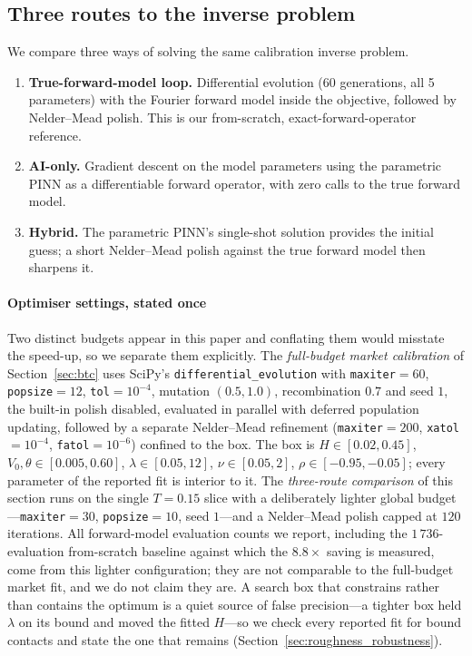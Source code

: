 \documentclass[preprint,12pt]{elsarticle}
\begin{document}
\subsection{Three routes to the inverse problem}
We compare three ways of solving the same calibration inverse problem.
\begin{enumerate}
  \item \textbf{True-forward-model loop.} Differential evolution (60
        generations, all 5 parameters) with the Fourier forward model inside the
        objective, followed by Nelder--Mead polish. This is our from-scratch,
        exact-forward-operator reference.
  \item \textbf{AI-only.} Gradient descent on the model parameters using the
        parametric PINN as a differentiable forward operator, with zero calls to
        the true forward model.
  \item \textbf{Hybrid.} The parametric PINN's single-shot solution provides the
        initial guess; a short Nelder--Mead polish against the true forward
        model then sharpens it.
\end{enumerate}

\paragraph{Optimiser settings, stated once}\label{par:optimiser}
Two distinct budgets appear in this paper and conflating them would misstate the
speed-up, so we separate them explicitly. The \emph{full-budget market
calibration} of Section~\ref{sec:btc} uses SciPy's \texttt{differential\_evolution}
with \texttt{maxiter}${=}60$, \texttt{popsize}${=}12$, \texttt{tol}${=}10^{-4}$,
mutation $(0.5,1.0)$, recombination $0.7$ and seed $1$, the built-in polish
disabled, evaluated in parallel with deferred population updating, followed by a
separate Nelder--Mead refinement (\texttt{maxiter}${=}200$,
\texttt{xatol}${=}10^{-4}$, \texttt{fatol}${=}10^{-6}$) confined to the box. The
box is $H\in[0.02,0.45]$, $V_0,\theta\in[0.005,0.60]$, $\lambda\in[0.05,12]$,
$\nu\in[0.05,2]$, $\rho\in[-0.95,-0.05]$; every parameter of the reported fit is
interior to it. The \emph{three-route comparison} of this section runs on the
single $T{=}0.15$ slice with a deliberately lighter global budget---\texttt{maxiter}${=}30$,
\texttt{popsize}${=}10$, seed $1$---and a Nelder--Mead polish capped at $120$
iterations. All forward-model evaluation counts we report, including the
$1\,736$-evaluation from-scratch baseline against which the $8.8\times$ saving is
measured, come from this lighter configuration; they are not comparable to the
full-budget market fit, and we do not claim they are. A search box that
constrains rather than contains the optimum is a quiet source of false
precision---a tighter box held $\lambda$ on its bound and moved the fitted $H$---so
we check every reported fit for bound contacts and state the one that remains
(Section~\ref{sec:roughness_robustness}).
\end{document}

